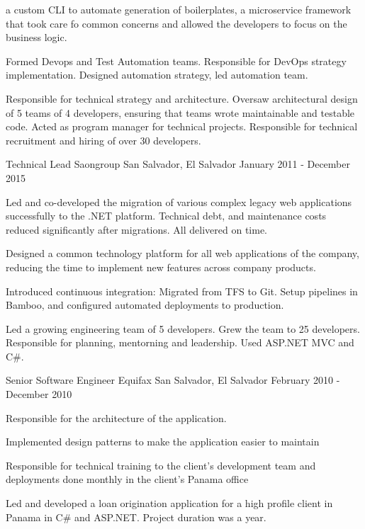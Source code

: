 \begin{cventries}
{\begin{cvitems}
{          a custom CLI to automate generation of boilerplates, a microservice
          framework that took care fo common concerns and allowed the developers
          to focus on the business logic.
        }
        \item {
          Formed Devops and Test Automation teams. Responsible for DevOps
          strategy implementation. Designed automation strategy, led automation team.
        }
      \end{cvitems}
    }
    {
      \begin{cventrysummary} %
        Responsible for technical strategy and architecture. Oversaw
        architectural design of 5 teams of 4 developers, ensuring that teams
        wrote maintainable and testable code. Acted as program
        manager for technical projects. Responsible for technical recruitment
        and hiring of over 30 developers.
      \end{cventrysummary}
    }

  \cventry
    {Technical Lead} %
    {Saongroup}
    {San Salvador, El Salvador}
    {January 2011 - December 2015} %
    {
      \begin{cvitems}
        \item {Led and co-developed the migration of various complex legacy web applications successfully to the .NET platform. Technical debt, and maintenance costs reduced significantly after migrations. All delivered on time.}
        \item {Designed a common technology platform for all web applications of the company, reducing the time to implement new features across company products.}
        \item {Introduced continuous integration: Migrated from TFS to Git. Setup pipelines in Bamboo, and configured automated deployments to production.}
      \end{cvitems}
    }
    {Led a growing engineering team of 5 developers. Grew the team to 25 developers. Responsible for planning, mentorning and leadership. Used ASP.NET MVC and C\#.}

  \cventry
    {Senior Software Engineer} %
    {Equifax} %
    {San Salvador, El Salvador} %
    {February 2010 - December 2010} %
    {
      \begin{cvitems} %
        \item {Responsible for the architecture of the application.}
        \item {Implemented design patterns to make the application easier to maintain}
        \item {Responsible for technical training to the client’s development team and deployments done monthly in the client’s Panama office}
      \end{cvitems}
    }
    {Led and developed a loan origination application for a high profile client in Panama in C\# and ASP.NET. Project duration was a year.}


\end{cventries}
